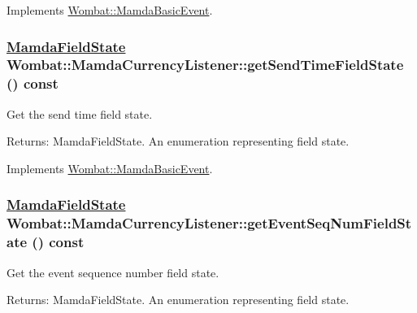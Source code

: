 Implements \hyperlink{classWombat_1_1MamdaBasicEvent_eb06352aca3280c5e89bad7a3b185cdf}{Wombat::Mamda\-Basic\-Event}.\hypertarget{classWombat_1_1MamdaCurrencyListener_5cbf04e2668f868816b2d7b6461d97dc}{
\subsubsection[getSendTimeFieldState]{\setlength{\rightskip}{0pt plus 5cm}\hyperlink{namespaceWombat_93aac974f2ab713554fd12a1fa3b7d2a}{Mamda\-Field\-State} Wombat::Mamda\-Currency\-Listener::get\-Send\-Time\-Field\-State () const}}
\label{classWombat_1_1MamdaCurrencyListener_5cbf04e2668f868816b2d7b6461d97dc}


Get the send time field state. 

\begin{Desc}
\item[Returns:]Mamda\-Field\-State. An enumeration representing field state. \end{Desc}


Implements \hyperlink{classWombat_1_1MamdaBasicEvent_418ecb29b412cd42581b54c87b5360fd}{Wombat::Mamda\-Basic\-Event}.\hypertarget{classWombat_1_1MamdaCurrencyListener_811aa7d57b26e148bbcbfd66f7f4f963}{
\subsubsection[getEventSeqNumFieldState]{\setlength{\rightskip}{0pt plus 5cm}\hyperlink{namespaceWombat_93aac974f2ab713554fd12a1fa3b7d2a}{Mamda\-Field\-State} Wombat::Mamda\-Currency\-Listener::get\-Event\-Seq\-Num\-Field\-State () const}}
\label{classWombat_1_1MamdaCurrencyListener_811aa7d57b26e148bbcbfd66f7f4f963}


Get the event sequence number field state. 

\begin{Desc}
\item[Returns:]Mamda\-Field\-State. An enumeration representing field state. \end{Desc}


